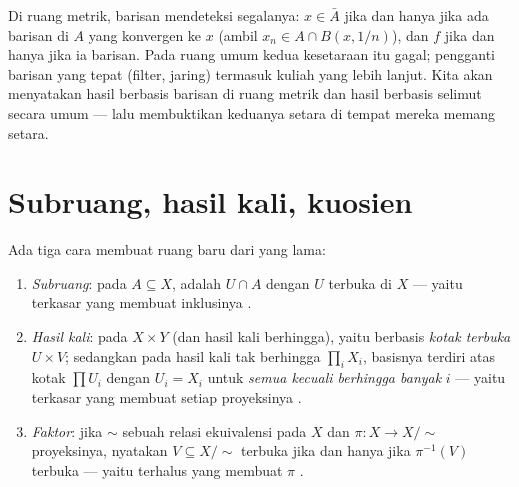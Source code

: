\begin{remark}\label{rem:b3:topology:sequences}
Di ruang metrik, barisan mendeteksi segalanya: $x \in \bar A$
jika dan hanya jika ada barisan di $A$ yang konvergen ke $x$ (ambil $x_n \in A \cap
B(x, 1/n)$), dan $f$  jika dan hanya jika ia  barisan.
Pada ruang umum kedua kesetaraan itu gagal; pengganti barisan
yang tepat (filter, jaring) termasuk kuliah yang lebih
lanjut. Kita akan menyatakan hasil berbasis barisan di ruang metrik
dan hasil berbasis selimut secara umum --- lalu membuktikan keduanya
setara di tempat mereka memang setara.
\end{remark}

\section{Subruang, hasil kali, kuosien}

\begin{definition}\label{def:b3:topology:constructions}
Ada tiga cara membuat ruang baru dari yang lama:
\begin{enumerate}
  \item \emph{Subruang}: pada $A \subseteq X$,  adalah
        $U \cap A$ dengan $U$ terbuka di $X$ --- yaitu 
        terkasar yang membuat inklusinya .
  \item \emph{Hasil kali}: pada $X \times Y$ (dan hasil kali berhingga),
        yaitu  berbasis \emph{kotak terbuka} $U \times
        V$; sedangkan pada hasil kali tak berhingga $\prod_i X_i$, basisnya
        terdiri atas kotak $\prod U_i$ dengan $U_i = X_i$ untuk
        \emph{semua kecuali berhingga banyak} $i$ --- yaitu 
        terkasar yang membuat setiap proyeksinya .
  \item \emph{Faktor}: jika $\sim$ sebuah relasi ekuivalensi pada $X$ dan
        $\pi\colon X \to X/{\sim}$ proyeksinya, nyatakan $V
        \subseteq X/{\sim}$ terbuka jika dan hanya jika $\pi^{-1}(V)$ terbuka ---
        yaitu  terhalus yang membuat $\pi$ .
\end{enumerate}
\end{definition}

